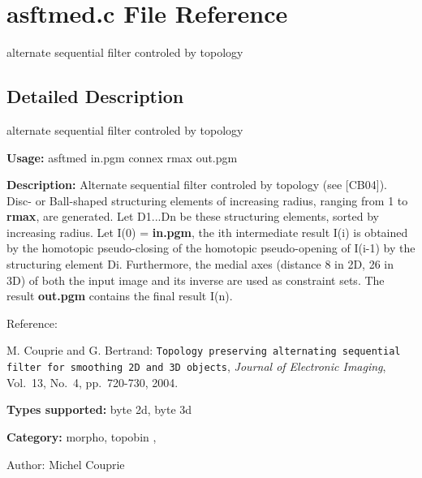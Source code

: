 \section{asftmed.c File Reference}
\label{asftmed_8c}
alternate sequential filter controled by topology  




\label{_details}
\subsection{Detailed Description}
alternate sequential filter controled by topology 

{\bf Usage:} asftmed in.pgm connex rmax out.pgm

{\bf Description:} Alternate sequential filter controled by topology (see [CB04]). Disc- or Ball-shaped structuring elements of increasing radius, ranging from 1 to {\bf rmax}, are generated. Let D1...Dn be these structuring elements, sorted by increasing radius. Let I(0) = {\bf in.pgm}, the ith intermediate result I(i) is obtained by the homotopic pseudo-closing of the homotopic pseudo-opening of I(i-1) by the structuring element Di. Furthermore, the medial axes (distance 8 in 2D, 26 in 3D) of both the input image and its inverse are used as constraint sets. The result {\bf out.pgm} contains the final result I(n).

Reference:\par
 [CB04] M. Couprie and G. Bertrand: {\tt Topology preserving alternating sequential filter for smoothing 2D and 3D objects}, {\em  Journal of Electronic Imaging\/}, Vol.~13, No.~4, pp.~720-730, 2004.

{\bf Types supported:} byte 2d, byte 3d

{\bf Category:} morpho, topobin ,

\begin{Desc}
\item[Author:]Michel Couprie \end{Desc}
